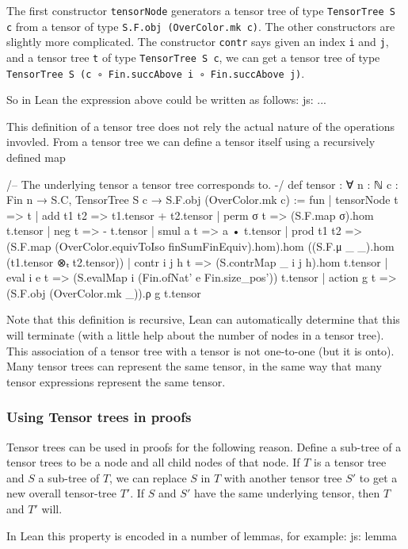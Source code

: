 \documentclass[a4paper, 11pt]{article}
\newcommand{\js}[1]{ {\color{magenta} js:  #1}}
\begin{document}
The first constructor \lstinline|tensorNode| generators a tensor tree of type  
\lstinline|TensorTree S c| from a tensor of type \lstinline|S.F.obj (OverColor.mk c)|.
The other constructors are slightly more complicated. The constructor \lstinline|contr| says 
given an index \lstinline|i| and \lstinline|j|, and a tensor tree \lstinline|t| of type 
\lstinline|TensorTree S c|, we can get a tensor tree of type \lstinline|TensorTree S (c ∘ Fin.succAbove i ∘ Fin.succAbove j)|. 

So in Lean the expression above could be written as follows:
\js{...}


This definition of a tensor tree does not rely the actual nature of the operations invovled. 
From a tensor tree we can define a tensor itself using a recursively defined map 
\begin{code}
/-- The underlying tensor a tensor tree corresponds to. -/
def tensor : ∀ {n : ℕ} {c : Fin n → S.C}, TensorTree S c → S.F.obj (OverColor.mk c) := fun
  | tensorNode t => t
  | add t1 t2 => t1.tensor + t2.tensor
  | perm σ t => (S.F.map σ).hom t.tensor
  | neg t => - t.tensor
  | smul a t => a • t.tensor
  | prod t1 t2 => (S.F.map (OverColor.equivToIso finSumFinEquiv).hom).hom
    ((S.F.μ _ _).hom (t1.tensor ⊗ₜ t2.tensor))
  | contr i j h t => (S.contrMap _ i j h).hom t.tensor
  | eval i e t => (S.evalMap i (Fin.ofNat' e Fin.size_pos')) t.tensor
  | action g t => (S.F.obj (OverColor.mk _)).ρ g t.tensor
\end{code}
Note that this definition is recursive, Lean can automatically determine that this will terminate 
(with a little help about the number of nodes in a tensor tree). 
This association of a tensor tree with a tensor is not one-to-one (but it is onto).
Many tensor trees can represent the same tensor, in the same way that many 
tensor expressions represent the same tensor. 


\subsubsection{Using Tensor trees in proofs}
Tensor trees can be used in proofs for the following reason. Define a sub-tree of a tensor trees 
to be a node and all child nodes of that node. 
If $T$ is a tensor tree and $S$ a sub-tree of $T$, we can replace $S$ in $T$ 
with another tensor tree $S'$
to get a new overall tensor-tree $T'$. If $S$ and $S'$ have the same underlying tensor, 
then $T$ and $T'$ will. 

In Lean this property is encoded in a number of lemmas, for example: 
\js{lemma}
\end{document}
